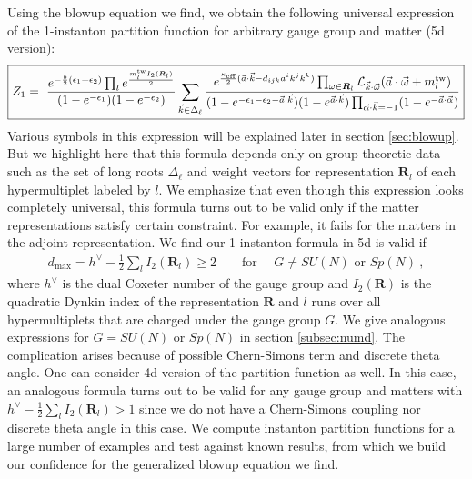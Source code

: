 \documentclass[letterpaper, 11pt]{article}
\def\CL{{\cal L}}
\def\e{\epsilon}
\def\w{\omega}
\def\half{\frac{1}{2}}
\begin{document}
Using the blowup equation we find, we obtain the following universal expression of the 1-instanton partition function for arbitrary gauge group and matter (5d version):
\begin{align}
\boxed{
  Z_1=\ \frac{e^{-\frac{b}{2}(\e_1 + \e_2)}\prod_{l}e^{\frac{m^\text{tw}_l I_2(\boldsymbol{R}_l)}{2}}}{(1-e^{-\e_1})(1-e^{-\e_2})} \sum_{\vec{k}\in\Delta_\ell}\frac{e^{\frac{\kappa_{\text{eff}}}{2}(\vec{a}\cdot\vec{k}-d_{ijk}a^ik^jk^k)}\prod_{\w \in \boldsymbol{R}_l} \CL_{\vec{k}\cdot\vec{\w}}(\vec{a}\cdot \vec{\w} + m_{l}^\text{tw})}{(1-e^{-\e_1-\e_2-\vec{a}\cdot\vec{k}})(1-e^{\vec{a}\cdot\vec{k}})\prod_{\vec{\alpha}\cdot \vec{k}=-1}(1-e^{-\vec{a}\cdot\vec{\alpha}})}}
\end{align} 
Various symbols in this expression will be explained later in section \ref{sec:blowup}. But we highlight here that this formula depends only on group-theoretic data such as the set of long roots $\Delta_\ell$ and weight vectors for representation $\mathbf{R}_l$ of each hypermultiplet labeled by $l$. 
We emphasize that even though this expression looks completely universal, this formula turns out to be valid only if the matter representations satisfy certain constraint. For example, it fails for the matters in the adjoint representation. We find our 1-instanton formula in 5d is valid if 
\begin{align}
  d_\text{max} = h^\vee -\frac{1}{2}\sum_l I_2(\mathbf{R}_l) \ge 2 \qquad \textrm{for } \quad G \neq SU(N) \textrm{ or } Sp(N) \ ,
\end{align}
where $h^\vee$ is the dual Coxeter number of the gauge group and $I_2(\mathbf{R})$ is the quadratic Dynkin index of the representation $\mathbf{R}$ and $l$ runs over all hypermultiplets that are charged under the gauge group $G$. We give analogous expressions for $G=SU(N)$ or $Sp(N)$ in section \ref{subsec:numd}. The complication arises because of possible Chern-Simons term and discrete theta angle. One can consider 4d version of the partition function as well. In this case, an analogous formula turns out to be valid for any gauge group and matters with $h^\vee - \half \sum_l I_2(\mathbf{R}_l) >1$ since we do not have a Chern-Simons coupling nor discrete theta angle in this case. 
We compute instanton partition functions for a large number of examples and test against known results, from which we build our confidence for the generalized blowup equation we find. 
\end{document}
